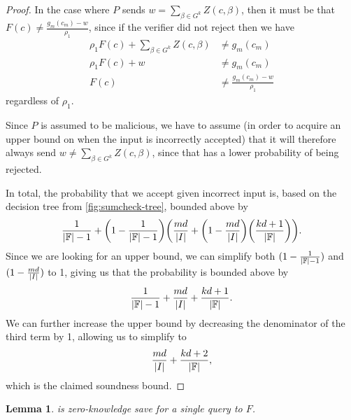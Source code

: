 \documentclass[english,12pt]{reedthesis}
\theoremstyle{plain}
\newtheorem{lemma}[lemma]{Lemma}
\theoremstyle{definition}
\theoremstyle{remark}
\DeclarePairedDelimiter{\abs}{\lvert}{\rvert}
\begin{document}
\begin{proof}
  In the case where $P$ sends $w = \sum_{\beta \in G^{k}}Z(c, \beta)$, then it must be that
  $F(c) \ne \frac{g_{m}(c_{m})-w}{\rho_{1}}$, since if the verifier did not reject
  then we have
  \begin{align*}
    \rho_{1}F(c) + \sum_{\beta \in G^{k}}Z(c, \beta) &\ne g_{m}(c_{m}) \\
    \rho_{1}F(c) + w &\ne g_{m}(c_{m}) \\
    F(c) &\ne \frac{g_{m}(c_{m})-w}{\rho_{1}}
  \end{align*}
  regardless of $\rho_{1}$.

  Since $P$ is assumed to be malicious, we have to assume (in order to acquire
  an upper bound on when the input is incorrectly accepted) that it will
  therefore always send $w \ne \sum_{\beta \in G^{k}}Z(c, \beta)$, since that has a lower
  probability of being rejected.

  In total, the probability that we accept given incorrect input is, based on
  the decision tree from \cref{fig:sumcheck-tree}, bounded above by
  \begin{equation}
    \frac{1}{\abs{\mathbb{F}} - 1} + \mleft(1 - \frac{1}{\abs{\mathbb{F}} - 1}\mright)\mleft(
      \frac{md}{\abs{I}} + \mleft(1 - \frac{md}{\abs{I}}\mright)\mleft(
        \frac{kd + 1}{\abs{\mathbb{F}}}
      \mright)
    \mright).
  \end{equation}
  Since we are looking for an upper bound, we can simplify both
  $(1 - \frac{1}{\abs{\mathbb{F}} - 1})$ and $(1 - \frac{md}{\abs{I}})$ to 1,
  giving us that the probability is bounded above by
  \begin{equation}
    \frac{1}{\abs{\mathbb{F}} - 1} + \frac{md}{\abs{I}} + \frac{kd + 1}{\abs{\mathbb{F}}}.
  \end{equation}
  We can further increase the upper bound by decreasing the denominator of the
  third term by 1, allowing us to simplify to
  \begin{equation}
    \frac{md}{\abs{I}} + \frac{kd + 2}{\abs{\mathbb{F}}},
  \end{equation}
  which is the claimed soundness bound.
\end{proof}

\begin{lemma}\label{lem:sumcheck-is-pzk}
   is zero-knowledge save for a single query to $F$.
\end{lemma}
\end{document}
